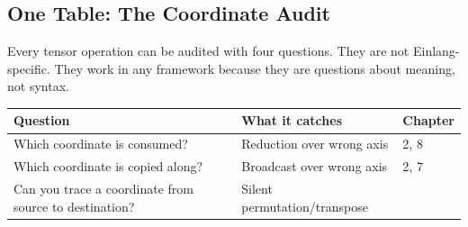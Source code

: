 \documentclass[11pt,titlepage]{article}
\begin{document}
\hypertarget{one-table-the-coordinate-audit}{%
\subsection{One Table: The Coordinate
Audit}\label{one-table-the-coordinate-audit}}

Every tensor operation can be audited with four questions. They are not
Einlang-specific. They work in any framework because they are questions
about meaning, not syntax.

\begin{longtable}[]{@{}lll@{}}
\toprule
\begin{minipage}[b]{0.30\columnwidth}\raggedright
Question\strut
\end{minipage} & \begin{minipage}[b]{0.30\columnwidth}\raggedright
What it catches\strut
\end{minipage} & \begin{minipage}[b]{0.30\columnwidth}\raggedright
Chapter\strut
\end{minipage}\tabularnewline
\midrule
\endhead
\begin{minipage}[t]{0.30\columnwidth}\raggedright
Which coordinate is consumed?\strut
\end{minipage} & \begin{minipage}[t]{0.30\columnwidth}\raggedright
Reduction over wrong axis\strut
\end{minipage} & \begin{minipage}[t]{0.30\columnwidth}\raggedright
2, 8\strut
\end{minipage}\tabularnewline
\begin{minipage}[t]{0.30\columnwidth}\raggedright
Which coordinate is copied along?\strut
\end{minipage} & \begin{minipage}[t]{0.30\columnwidth}\raggedright
Broadcast over wrong axis\strut
\end{minipage} & \begin{minipage}[t]{0.30\columnwidth}\raggedright
2, 7\strut
\end{minipage}\tabularnewline
\begin{minipage}[t]{0.30\columnwidth}\raggedright
Can you trace a coordinate from source to destination?\strut
\end{minipage} & \begin{minipage}[t]{0.30\columnwidth}\raggedright
Silent permutation/transpose\strut
\end{minipage} & \begin{minipage}[t]{0.30\columnwidth}\raggedright

\end{minipage}
\end{longtable}
\end{document}
